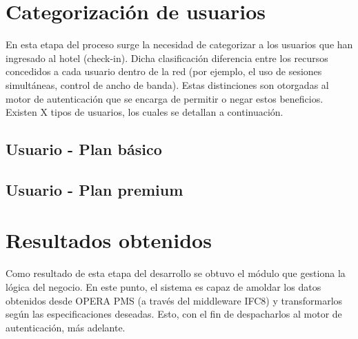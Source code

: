 \section{Categorización de usuarios} \label{sect:Categorización de usuarios}
		En esta etapa del proceso surge la necesidad de categorizar a los usuarios que han ingresado al hotel (check-in). Dicha clasificación diferencia entre los recursos concedidos a cada usuario dentro de la red (por ejemplo, el uso de sesiones simultáneas, control de ancho de banda). Estas distinciones son otorgadas al motor de autenticación que se encarga de permitir o negar estos beneficios. Existen X tipos de usuarios, los cuales se detallan a continuación.
		
\subsection{Usuario - Plan básico}
\subsection{Usuario - Plan premium}
		
\section{Resultados obtenidos} \label{sect:Resultados obtenidos}
		Como resultado de esta etapa del desarrollo se obtuvo el módulo que gestiona la lógica del negocio. En este punto, el sistema es capaz de amoldar los datos obtenidos desde OPERA PMS (a través del middleware IFC8) y transformarlos según las especificaciones deseadas. Esto, con el fin de despacharlos al motor de autenticación, más adelante.